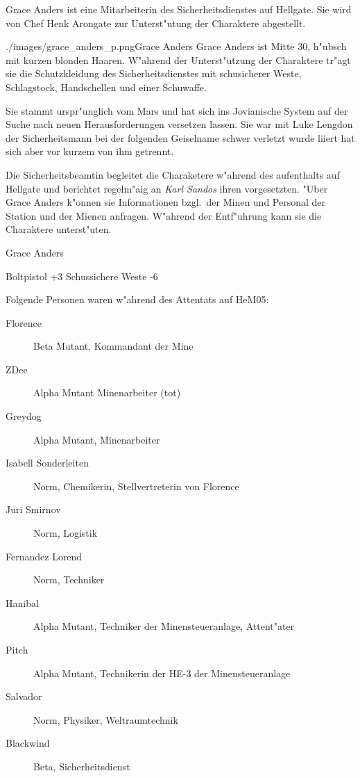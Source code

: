 Grace Anders ist eine Mitarbeiterin des Sicherheitsdienstes auf Hellgate. Sie wird von Chef Henk Arongate zur 
Unterst"utung der Charaktere abgestellt. 

\begin{sideimagebox}[l]{0.5}{./images/grace_anders_p.png}{Grace Anders}
    Grace Anders ist Mitte 30, h"ubsch mit kurzen blonden Haaren. W"ahrend der Unterst"utzung der Charaktere tr"agt sie 
    die Schutzkleidung des Sicherheitsdienstes mit schu\3sicherer Weste, Schlagstock, Handschellen und einer Schu\3waffe. 

    Sie stammt urspr"unglich vom Mars und hat sich ins Jovianische System auf der Suche nach neuen Herausforderungen 
    versetzen lassen. Sie war mit Luke Lengdon der Sicherheitsmann bei der folgenden Geiselname schwer verletzt wurde 
    liiert hat sich aber vor kurzem von ihm getrennt.

    Die Sicherheitsbeamtin begleitet die Charaketere w"ahrend des aufenthalts auf Hellgate und berichtet regelm"a\3ig an 
    \emph{Karl Sandos} ihren vorgesetzten. "Uber Grace Anders k"onnen sie Informationen bzgl.~der Minen und Personal der 
    Station und der Mienen anfragen. W"ahrend der Entf"uhrung kann sie die Charaktere unterst"uten.
\end{sideimagebox}

\begin{nscsheet}{Grace Anders}
    \nscstats[ATT=4,AGG=3,EMP=4,KNO=3,HP=10]
    \nscruler
    \begin{nscinventory}
        \nscitem[Waffen] Boltpistol +3
        \nscitem[R"ustung] Schussichere Weste -6
    \end{nscinventory}
\end{nscsheet}



Folgende Personen waren w"ahrend des Attentats auf HeM05:

\begin{description}
    \item[Florence] Beta Mutant, Kommandant der Mine    
    \item[ZDee] Alpha Mutant Minenarbeiter (tot)
    \item[Greydog] Alpha Mutant, Minenarbeiter
    \item[Isabell Sonderleiten] Norm, Chemikerin, Stellvertreterin von Florence
    \item[Juri Smirnov] Norm, Logistik
    \item[Fernandez Lorend] Norm, Techniker
    \item[Hanibal] Alpha Mutant, Techniker der Minensteueranlage, Attent"ater
    \item[Pitch] Alpha Mutant, Technikerin der HE-3 der Minensteueranlage
    \item[Salvador] Norm, Physiker, Weltraumtechnik
    \item[Blackwind] Beta, Sicherheitsdienst
\end{description}

